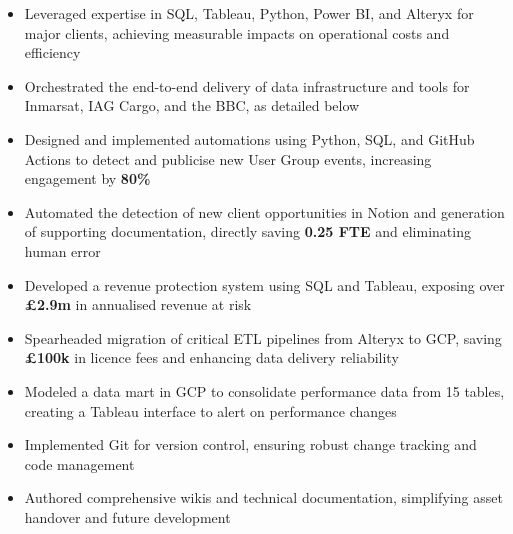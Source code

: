 \begin{paracol}{2}

\begin{itemize}
\item Leveraged expertise in SQL, Tableau, Python, Power BI, and Alteryx for major clients, achieving measurable impacts on operational costs and efficiency
\item Orchestrated the end-to-end delivery of data infrastructure and tools for Inmarsat, IAG Cargo, and the BBC, as detailed below
\item Designed and implemented automations using Python, SQL, and GitHub Actions to detect and publicise new User Group events, increasing engagement by \textbf{80\%}
\item Automated the detection of new client opportunities in Notion and generation of supporting documentation, directly saving \textbf{0.25 FTE} and eliminating human error

\medskip
{}

\end{itemize}

\divider

\begin{itemize}
\item Developed a revenue protection system using SQL and Tableau, exposing over \textbf{£2.9m} in annualised revenue at risk
\item Spearheaded migration of critical ETL pipelines from Alteryx to GCP, saving \textbf{£100k} in licence fees and enhancing data delivery reliability
\item Modeled a data mart in GCP to consolidate performance data from 15 tables, creating a Tableau interface to alert on performance changes
\item Implemented Git for version control, ensuring robust change tracking and code management
\item Authored comprehensive wikis and technical documentation, simplifying asset handover and future development


\end{itemize}
\end{paracol}
